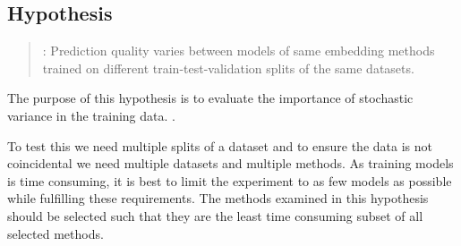 \addtocounter{hcounter}{1}
\subsection{Hypothesis \thehcounter} %
\label{sec:hypothesis_\thehcounter}

\begin{quote}
:
Prediction quality varies between models of same embedding methods trained on different train-test-validation splits of the same datasets.
\end{quote}

The purpose of this hypothesis is to evaluate the importance of stochastic variance in the training data. .

To test this we need multiple splits of a dataset and to ensure the data is not coincidental we need multiple datasets and multiple methods.
As training models is time consuming, it is best to limit the experiment to as few models as possible while fulfilling these requirements.
The methods examined in this hypothesis should be selected such that they are the least time consuming subset of all selected methods.